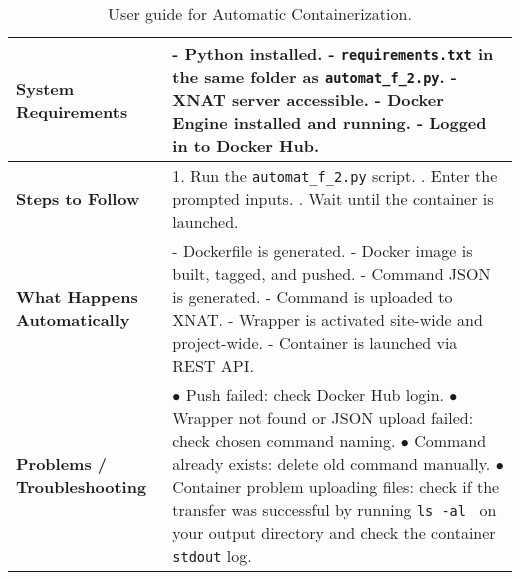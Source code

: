 \begin{table}[H]
  \centering
  \caption{ User guide for Automatic Containerization.}
  \label{tab:automatic_script}
  \begin{tabular}{|l|p{9cm}|}
  \hline
  \textbf{System Requirements} & 
  - Python installed. \newline
  - \texttt{requirements.txt} in the same folder as \texttt{automat\_f\_2.py}. \newline
  - XNAT server accessible. \newline
  - Docker Engine installed and running. \newline
  - Logged in to Docker Hub. \\  \hline
  \textbf{Steps to Follow} & 
  1. Run the \texttt{automat\_f\_2.py} script. \newline
  2. Enter the prompted inputs. \newline
  3. Wait until the container is launched. \\
  \hline
  \textbf{What Happens Automatically} & 
  - Dockerfile is generated. \newline
  - Docker image is built, tagged, and pushed. \newline
  - Command JSON is generated. \newline
  - Command is uploaded to XNAT. \newline
  - Wrapper is activated site-wide and project-wide. \newline
  - Container is launched via REST API. \\
  \hline
  \textbf{Problems / Troubleshooting} & 
  $\bullet$ Push failed: check Docker Hub login. \newline
  $\bullet$ Wrapper not found or JSON upload failed: check chosen command naming. \newline
  $\bullet$ Command already exists: delete old command manually. \newline
  $\bullet$ Container problem uploading files: check if the transfer was successful by running \texttt{ls -al \*} on your output directory and check the container \texttt{stdout} log. \\
  \hline
  \end{tabular}
\end{table}


\normalsize

